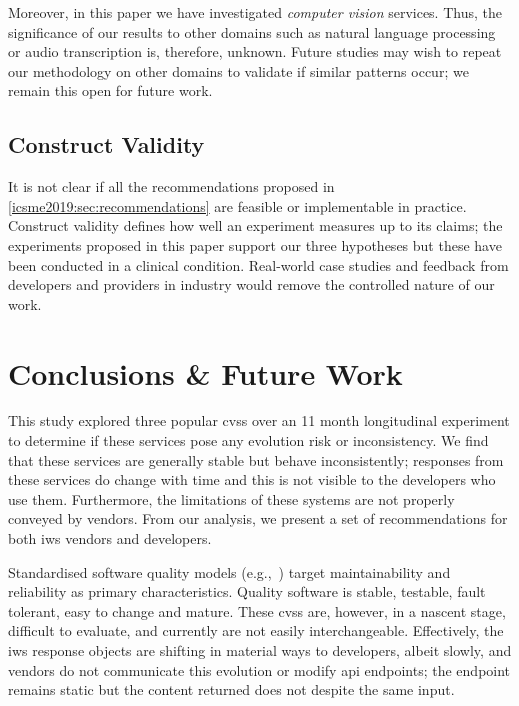 Moreover, in this paper we have investigated \textit{computer vision} services. Thus, the significance of our results to other domains such as natural language processing or audio transcription is, therefore, unknown. Future studies may wish to repeat our methodology on other domains to validate if similar patterns occur; we remain this open for future work.

\subsection{Construct Validity}

It is not clear if all the recommendations proposed in \cref{icsme2019:sec:recommendations}  are feasible or implementable in practice. Construct validity defines how well an experiment measures up to its claims; the experiments proposed in this paper support our three hypotheses but these have been conducted in a clinical condition. Real-world case studies and feedback from developers and providers in industry would remove the controlled nature of our work.

\section{Conclusions \& Future Work}
\label{icsme2019:sec:conclusions}

This study explored three popular \glspl{cvs} over an 11 month longitudinal experiment to determine if these services pose any evolution risk or inconsistency. We find that these services are generally stable but behave inconsistently; responses from these services do change with time and this is not visible to the developers who use them. Furthermore, the limitations of these systems are not properly conveyed by vendors. From our analysis, we present a set of recommendations for both \gls{iws} vendors and developers.

Standardised software quality models (e.g.,~\citep{ISO9126:1999}) target maintainability and reliability as primary characteristics. Quality software is stable, testable, fault tolerant, easy to change and mature. These \glspl{cvs} are, however, in a nascent stage, difficult to evaluate, and currently are not easily interchangeable. Effectively, the \gls{iws} response objects are shifting in material ways to developers, albeit slowly, and vendors do not  communicate this evolution or modify \gls{api} endpoints; the endpoint remains static but the content returned does not despite the same input.


